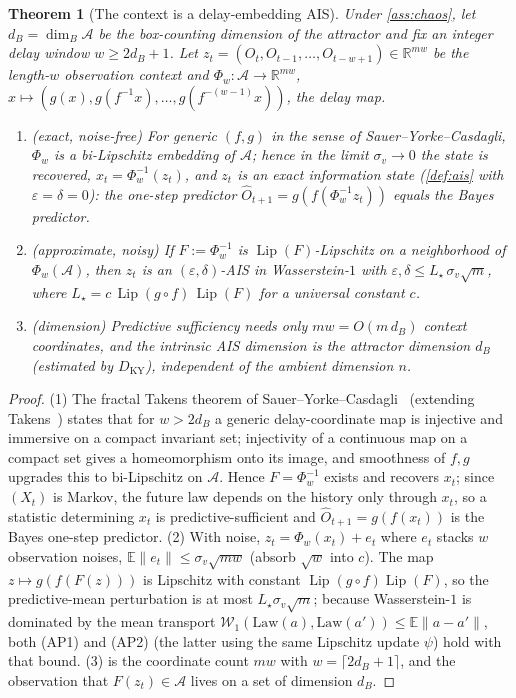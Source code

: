 \documentclass[10pt]{article}
\theoremstyle{plain}
\newtheorem{theorem}{Theorem}[section]
\theoremstyle{definition}
\theoremstyle{remark}
\newcommand{\R}{\mathbb{R}}
\newcommand{\E}{\mathbb{E}}
\newcommand{\eps}{\varepsilon}
\newcommand{\attr}{\mathcal{A}}
\newcommand{\DKY}{D_{\mathrm{KY}}}
\newcommand{\boxdim}{\dim_{B}}
\newcommand{\Wass}{\mathcal{W}_1}
\DeclareMathOperator{\Lip}{Lip}
\begin{document}
\begin{theorem}[The context is a delay-embedding AIS]\label{thm:takens}
Under \cref{ass:chaos}, let $d_B=\boxdim\attr$ be the box-counting dimension of
the attractor and fix an integer delay window $w\ge 2d_B+1$. Let
$z_t=(O_t,O_{t-1},\dots,O_{t-w+1})\in\R^{mw}$ be the length-$w$ observation
context and $\Phi_w:\attr\to\R^{mw}$, $x\mapsto(g(x),g(f^{-1}x),\dots,
g(f^{-(w-1)}x))$, the delay map.
\begin{enumerate}[leftmargin=1.7em,itemsep=1pt]
\item \textup{(exact, noise-free)} For generic $(f,g)$ in the sense of
Sauer--Yorke--Casdagli, $\Phi_w$ is a bi-Lipschitz embedding of $\attr$; hence in
the limit $\sigma_v\to0$ the state is recovered, $x_t=\Phi_w^{-1}(z_t)$, and $z_t$
is an \emph{exact} information state \textup{(}\cref{def:ais} with
$\eps=\delta=0$\textup{)}: the one-step predictor $\hat O_{t+1}=g(f(\Phi_w^{-1}
z_t))$ equals the Bayes predictor.
\item \textup{(approximate, noisy)} If $F:=\Phi_w^{-1}$ is $\Lip(F)$-Lipschitz on
a neighborhood of $\Phi_w(\attr)$, then $z_t$ is an $(\eps,\delta)$-AIS in
Wasserstein-$1$ with $\eps,\delta\le L_\star\,\sigma_v\sqrt m$, where
$L_\star=c\,\Lip(g\circ f)\,\Lip(F)$ for a universal constant $c$.
\item \textup{(dimension)} Predictive sufficiency needs only $mw=O(m\,d_B)$
context coordinates, and the intrinsic AIS dimension is the attractor dimension
$d_B$ (estimated by $\DKY$), \emph{independent of the ambient dimension $n$}.
\end{enumerate}
\end{theorem}
\begin{proof}
(1) The fractal Takens theorem of Sauer--Yorke--Casdagli~\cite{sauer1991}
(extending Takens~\cite{takens1981}) states that for $w>2d_B$ a generic
delay-coordinate map is injective and immersive on a compact invariant set;
injectivity of a continuous map on a compact set gives a homeomorphism onto its
image, and smoothness of $f,g$ upgrades this to bi-Lipschitz on $\attr$. Hence
$F=\Phi_w^{-1}$ exists and recovers $x_t$; since $(X_t)$ is Markov, the future law
depends on the history only through $x_t$, so a statistic determining $x_t$ is
predictive-sufficient and $\hat O_{t+1}=g(f(x_t))$ is the Bayes one-step
predictor.
(2) With noise, $z_t=\Phi_w(x_t)+e_t$ where $e_t$ stacks $w$ observation noises,
$\E\|e_t\|\le\sigma_v\sqrt{mw}$ (absorb $\sqrt w$ into $c$). The map
$z\mapsto g(f(F(z)))$ is Lipschitz with constant $\Lip(g\circ f)\Lip(F)$, so the
predictive-mean perturbation is at most $L_\star\sigma_v\sqrt m$; because
Wasserstein-$1$ is dominated by the mean transport
$\Wass(\mathrm{Law}(a),\mathrm{Law}(a'))\le\E\|a-a'\|$, both (AP1) and (AP2)
(the latter using the same Lipschitz update $\psi$) hold with that bound.
(3) is the coordinate count $mw$ with $w=\lceil2d_B+1\rceil$, and the observation
that $F(z_t)\in\attr$ lives on a set of dimension $d_B$.
\end{proof}
\end{document}
